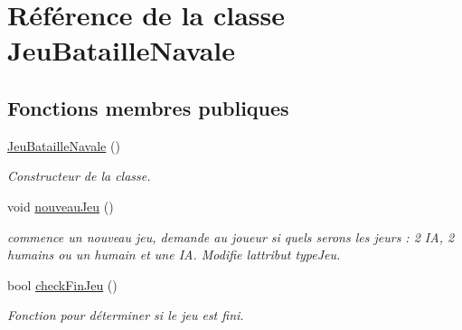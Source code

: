 \hypertarget{class_jeu_bataille_navale}{}\section{Référence de la classe Jeu\+Bataille\+Navale}
\label{class_jeu_bataille_navale}
\subsection*{Fonctions membres publiques}
\begin{DoxyCompactItemize}
\item 
\hyperlink{class_jeu_bataille_navale_aae41366decd137f03ac95aff8b8e0f49}{Jeu\+Bataille\+Navale} ()\hypertarget{class_jeu_bataille_navale_aae41366decd137f03ac95aff8b8e0f49}{}\label{class_jeu_bataille_navale_aae41366decd137f03ac95aff8b8e0f49}

\begin{DoxyCompactList}\small\item\em Constructeur de la classe. \end{DoxyCompactList}\item 
void \hyperlink{class_jeu_bataille_navale_a3f59d8ee46918984df4a13cd261d5491}{nouveau\+Jeu} ()\hypertarget{class_jeu_bataille_navale_a3f59d8ee46918984df4a13cd261d5491}{}\label{class_jeu_bataille_navale_a3f59d8ee46918984df4a13cd261d5491}

\begin{DoxyCompactList}\small\item\em commence un nouveau jeu, demande au joueur si quels serons les jeurs \+: 2 IA, 2 humains ou un humain et une IA. Modifie l\textquotesingle{}attribut type\+Jeu. \end{DoxyCompactList}\item 
bool \hyperlink{class_jeu_bataille_navale_ad23d49de0aee0b1b182c96a22cb42ffb}{check\+Fin\+Jeu} ()
\begin{DoxyCompactList}\small\item\em Fonction pour déterminer si le jeu est fini. \end{DoxyCompactList}\end{DoxyCompactItemize}
